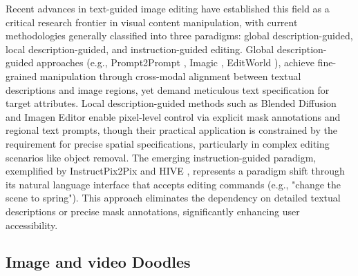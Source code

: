 Recent advances in text-guided image editing have established this field as a critical research frontier in visual content manipulation, with current methodologies generally classified into three paradigms: global description-guided, local description-guided, and instruction-guided editing. Global description-guided approaches (e.g., Prompt2Prompt \cite{p2p}, Imagic \cite{kawar2023imagic}, EditWorld \cite{editworld} ), achieve fine-grained manipulation through cross-modal alignment between textual descriptions and image regions, yet demand meticulous text specification for target attributes. Local description-guided methods such as Blended Diffusion \cite{avrahami2022blended} and Imagen Editor \cite{imageneditor} enable pixel-level control via explicit mask annotations and regional text prompts, though their practical application is constrained by the requirement for precise spatial specifications, particularly in complex editing scenarios like object removal. The emerging instruction-guided paradigm, exemplified by InstructPix2Pix \cite{brooks2023instructpix2pix} and HIVE \cite{zhang2024hive}, represents a paradigm shift through its natural language interface that accepts editing commands (e.g., "change the scene to spring"). This approach eliminates the dependency on detailed textual descriptions or precise mask annotations, significantly enhancing user accessibility.

\subsection{Image and video Doodles}


